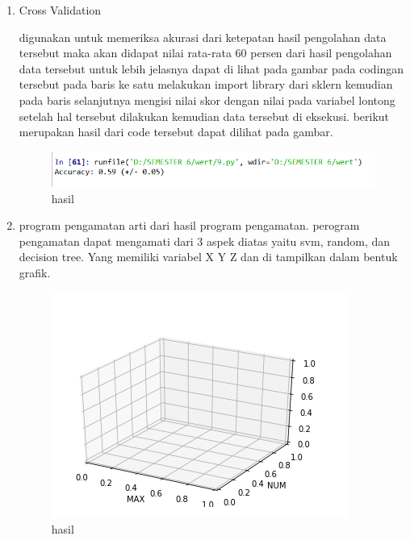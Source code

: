 \begin{enumerate}
\item Cross Validation\par
 digunakan untuk memeriksa akurasi dari ketepatan hasil pengolahan data tersebut maka akan didapat nilai rata-rata 60 persen dari hasil pengolahan data tersebut untuk lebih jelasnya dapat di lihat pada gambar pada codingan tersebut pada baris ke satu melakukan import library dari sklern kemudian pada baris selanjutnya mengisi nilai skor dengan nilai pada variabel lontong setelah hal tersebut dilakukan kemudian data tersebut di eksekusi. berikut merupakan hasil dari code tersebut dapat dilihat pada gambar.

\begin{figure}[ht]
\centering
\includegraphics[scale=0.5]{figures/1174050/chapter3/10.PNG}
\caption{hasil}
\label{contoh}
\end{figure}

\item program pengamatan
arti dari hasil program pengamatan. perogram pengamatan dapat mengamati dari 3 aspek diatas yaitu svm, random, dan decision tree. Yang memiliki variabel X Y Z dan di tampilkan dalam bentuk grafik. 

\begin{figure}[ht]
\centering
\includegraphics[scale=0.5]{figures/1174050/chapter3/11.PNG}
\caption{hasil}
\label{contoh}
\end{figure}
\end{enumerate}


